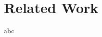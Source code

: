 
\section{Related Work}\label{sec:related-work}
abc

\cite{backstrom2011supervised}

\cite{elo1986rating}

\cite{kwak2010twitter}

\cite{welch2011topical}

\cite{wu2011says}

\cite{yang2011like}